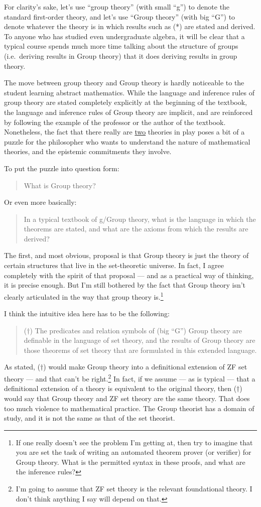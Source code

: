 \documentclass[12pt,fleqn]{article}
\begin{document}
For clarity's sake, let's use ``group theory'' (with small ``g'') to
denote the standard first-order theory, and let's use ``Group theory''
(with big ``G'') to denote whatever the theory is in which results
such as (*) are stated and derived. To anyone who has studied even
undergraduate algebra, it will be clear that a typical course spends
much more time talking about the structure of groups (i.e.\ deriving
results in Group theory) that it does deriving results in group
theory.

The move between group theory and Group theory is hardly noticeable to
the student learning abstract mathematics. While the language and
inference rules of group theory are stated completely explicitly at
the beginning of the textbook, the language and inference rules of
Group theory are implicit, and are reinforced by following the example
of the professor or the author of the textbook. Nonetheless, the fact
that there really are \underline{two} theories in play poses a bit of
a puzzle for the philosopher who wants to understand the nature of
mathematical theories, and the epistemic commitments they involve.

To put the puzzle into question form:
\begin{quote} What is Group theory? \end{quote} Or even more
basically:
\begin{quote} In a typical textbook of g/Group theory, what is the
  language in which the theorems are stated, and what are the axioms
  from which the results are derived? \end{quote} The first, and most
obvious, proposal is that Group theory is just the theory of certain
structures that live in the set-theoretic universe. In fact, I agree
completely with the spirit of that proposal --- and as a practical way
of thinking, it is precise enough. But I'm still bothered by the fact
that Group theory isn't clearly articulated in the way that group
theory is.\footnote{If one really doesn't see the problem I'm getting
  at, then try to imagine that you are set the task of writing an
  automated theorem prover (or verifier) for Group theory. What is the
  permitted syntax in these proofs, and what are the inference rules?}

I think the intuitive idea here has to be the following:
\begin{quote}
  ($\dagger$) The predicates and relation symbols of (big ``G'') Group
  theory are definable in the language of set theory, and the results
  of Group theory are those theorems of set theory that are formulated
  in this extended language. \end{quote} As stated, ($\dagger$) would
make Group theory into a definitional extension of ZF set theory ---
and that can't be right.\footnote{I'm going to assume that ZF set
  theory is the relevant foundational theory. I don't think anything I
  say will depend on that.} In fact, if we assume --- as is typical
--- that a definitional extension of a theory is equivalent to the
original theory, then ($\dagger$) would say that Group theory and ZF
set theory are the same theory. That does too much violence to
mathematical practice. The Group theorist has a domain of study, and
it is not the same as that of the set theorist.
\end{document}

